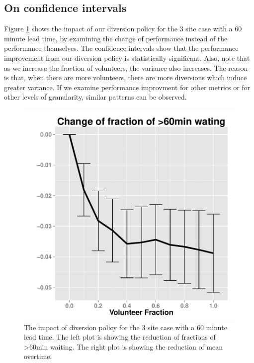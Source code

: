 \subsection{On confidence intervals}

Figure \ref{fig:ci} shows the impact of our diversion policy
for the 3 site case with a 60 minute lead time, by examining the
change of performance instead of the performance themselves.
The confidence intervals show that the performance improvement
from our diversion policy is statistically
significant. Also, note that as we increase the fraction of
volunteers, the variance also increases. The reason is that,
when there are more volunteers, there are more diversions which
induce greater variance. If we examine performance improvment
for other metrics or for other levels of granularity, similar patterns
can be observed.

\begin{figure}[htp]
\centering
\includegraphics[width=.95\textwidth]{chap3/numeric/pic/ci}
\caption{The impact of diversion policy for the 3 site case
with a 60 minute lead time. The left plot is showing the
reduction of fractions of >60min waiting. The right plot
is showing the reduction of mean overtime.}
\label{fig:ci}
\end{figure}
